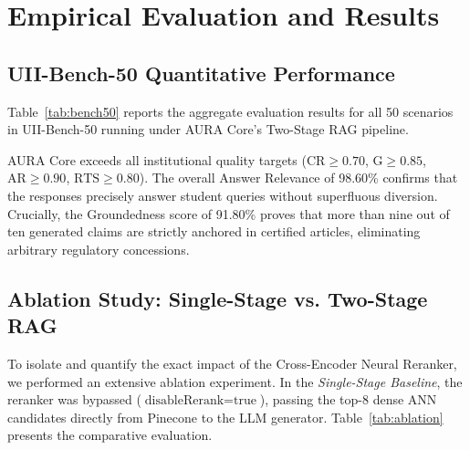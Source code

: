 \documentclass[conference]{IEEEtran}
\begin{document}
\section{Empirical Evaluation and Results}

\subsection{UII-Bench-50 Quantitative Performance}
Table~\ref{tab:bench50} reports the aggregate evaluation results for all 50 scenarios in UII-Bench-50 running under AURA Core's Two-Stage RAG pipeline.

\begin{table}[htbp]
\caption{UII-Bench-50 Aggregate Performance Across Five Regulatory Clusters (Two-Stage Pipeline)}
\label{tab:bench50}
\centering
{}
\end{table}

AURA Core exceeds all institutional quality targets ($\text{CR} \ge 0.70$, $\text{G} \ge 0.85$, $\text{AR} \ge 0.90$, $\text{RTS} \ge 0.80$). The overall Answer Relevance of 98.60\% confirms that the responses precisely answer student queries without superfluous diversion. Crucially, the Groundedness score of 91.80\% proves that more than nine out of ten generated claims are strictly anchored in certified articles, eliminating arbitrary regulatory concessions.

\subsection{Ablation Study: Single-Stage vs. Two-Stage RAG}
To isolate and quantify the exact impact of the Cross-Encoder Neural Reranker, we performed an extensive ablation experiment. In the \textit{Single-Stage Baseline}, the reranker was bypassed ($\text{disableRerank} = \text{true}$), passing the top-8 dense ANN candidates directly from Pinecone to the LLM generator. Table~\ref{tab:ablation} presents the comparative evaluation.
\end{document}

